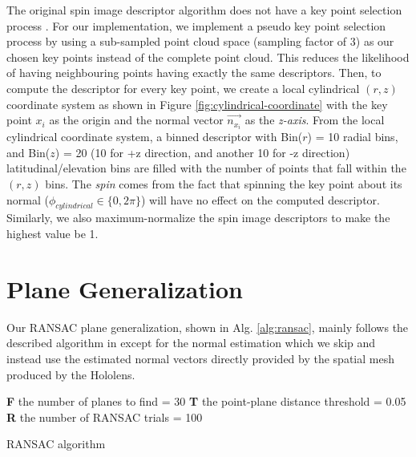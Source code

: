 \begin{appendix}
The original spin image descriptor algorithm does not have a key point selection process \cite{johnson1998surface,johnson1999using}. For our implementation, we implement a pseudo key point selection process by using a sub-sampled point cloud space (sampling factor of 3) as our chosen key points instead of the complete point cloud. This reduces the likelihood of having neighbouring points having exactly the same descriptors. Then, to compute the descriptor for every key point, we create a local cylindrical $(r,z)$ coordinate system as shown in Figure \ref{fig:cylindrical-coordinate} with the key point $x_i$ as the origin and the normal vector $\vec{n_{x_i}}$ as the \textit{z-axis}. From the local cylindrical coordinate system, a binned descriptor with Bin($r$) = 10 radial bins, and Bin($z$) = 20 (10 for +z direction, and another 10 for -z direction) latitudinal/elevation bins are filled with the number of points that fall within the $(r,z)$ bins. The \textit{spin} comes from the fact that spinning the key point about its normal ($\phi_{cylindrical} 
\in \{0,2\pi\}$) will have no effect on the computed descriptor. Similarly, we also maximum-normalize the spin image descriptors to make the highest value be 1.

\section{Plane Generalization}\label{apdx:generalization}

Our RANSAC plane generalization, shown in Alg. \ref{alg:ransac}, mainly follows the described algorithm in \cite{fischler1981random} except for the normal estimation which we skip and instead use the estimated normal vectors directly provided by the spatial mesh produced by the Hololens.

\begin{algorithm}[htbp]
    \small
	\DontPrintSemicolon
	\textbf{F} the number of planes to find = 30\;
	\textbf{T} the point-plane distance threshold = 0.05\;
	\textbf{R} the number of RANSAC trials = 100\;
	
	\BlankLine
	\caption{RANSAC algorithm \cite{fischler1981random}}
	\label{alg:ransac}
\end{algorithm}


\end{appendix}
